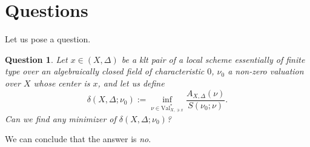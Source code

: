 \documentclass[a4paper,12pt]{amsart}
\newtheorem{question}[theorem]{Question}
\theoremstyle{definition} %
\theoremstyle{remark}
\numberwithin{equation}{section}
\begin{document}
\section{Questions} \label{4}
Let us pose a question.

\begin{question} \label{chatchatchat}
Let $x\in (X,\Delta)$ be a klt pair of a local scheme essentially of finite type over an algebraically closed field of characteristic $0$, $\nu_0$ a non-zero valuation over $X$ whose center is $x$, and let us define
$$ \delta(X,\Delta;\nu_0):=\inf_{\nu\in \mathrm{Val}^*_{X,\ni x}}\frac{A_{X,\Delta}(\nu)}{S(\nu_0;\nu)}.$$
Can we find any minimizer of $\delta(X,\Delta;\nu_0)$?
\end{question}

We can conclude that the answer is \emph{no}.
\end{document}
